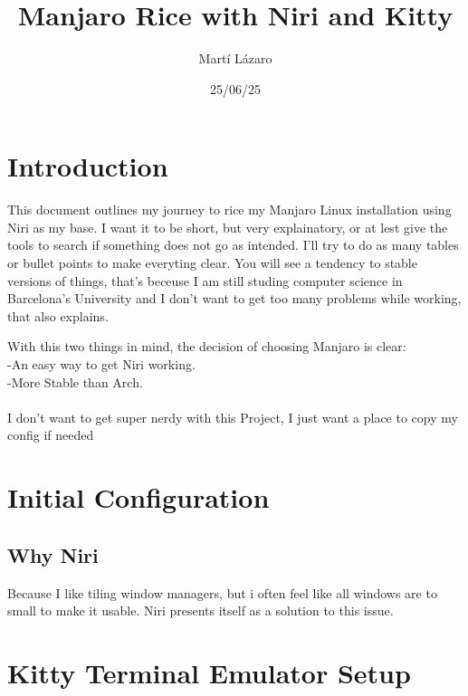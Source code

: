 \documentclass{article}
\title{Manjaro Rice with Niri and Kitty}
\author{Martí Lázaro}
\date{25/06/25}
\begin{document}
\maketitle

\section*{Introduction}
This document outlines my journey to rice my Manjaro Linux installation using Niri as my base.
I want it to be short, but very explainatory, or at lest give the tools to search if something does not go as intended.
I'll try to do as many tables or bullet points to make everyting clear.
You will see a tendency to stable versions of things, that's beceuse I am still studing computer science in Barcelona's University
and I don't want to get too many problems while working, that also explains.

With this two things in mind, the decision of choosing Manjaro is clear: \\
 -An easy way to get Niri working. \\
 -More Stable than Arch. \\
\\
I don't want to get super nerdy with this Project, I just want a place to copy my config if needed
\tableofcontents



\section{Initial Configuration}

\subsection*{Why Niri}
Because I like tiling window managers, but i often feel like all windows are to small to make it usable.
Niri presents itself as a solution to this issue.

\section{Kitty Terminal Emulator Setup}
\end{document}
